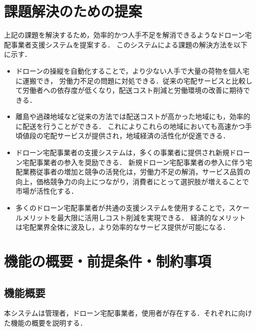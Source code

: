\documentclass[a4paper, titlepage]{jsarticle}
\begin{document}
\section{課題解決のための提案}
上記の課題を解決するため，効率的かつ人手不足を解消できるようなドローン宅配事業者支援システムを提案する．
このシステムによる課題の解決方法を以下に示す．
\begin{itemize}
    \item ドローンの操縦を自動化することで，より少ない人手で大量の荷物を個人宅に運搬でき，
    労働力不足の問題に対処できる．従来の宅配サービスと比較して労働者への依存度が低くなり，配送コスト削減と労働環境の改善に期待できる．

    \item 離島や過疎地域など従来の方法では配送コストが高かった地域にも，効率的に配送を行うことができる．
    これによりこれらの地域においても高速かつ手頃値段の宅配サービスが提供され，地域経済の活性化が促進できる．

    \item ドローン宅配事業者の支援システムは，多くの事業者に提供され新規ドローン宅配事業者の参入を奨励できる．
    新規ドローン宅配事業者の参入に伴う宅配業務従事者の増加と競争の活発化は，労働力不足の解消，サービス品質の向上，価格競争力の向上につながり，消費者にとって選択肢が増えることで市場が活性化する．

    \item 多くのドローン宅配事業者が共通の支援システムを使用することで，スケールメリットを最大限に活用しコスト削減を実現できる．
    経済的なメリットは宅配業界全体に波及し，より効率的なサービス提供が可能になる．


\end{itemize}

\section{機能の概要・前提条件・制約事項}
\subsection{機能概要}
本システムは管理者，ドローン宅配事業者，使用者が存在する．それぞれに向けた機能の概要を説明する．
\end{document}
